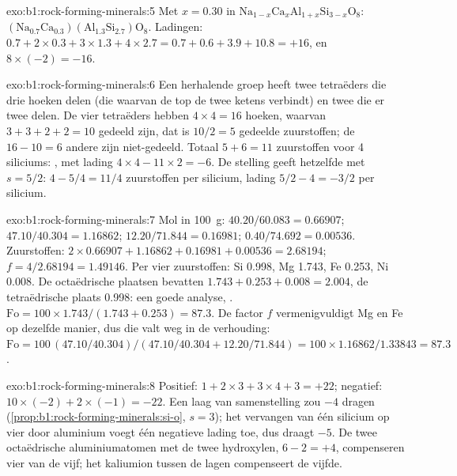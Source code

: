 \begin{solution}{exo:b1:rock-forming-minerals:5}
Met $x = 0.30$ in $\mathrm{Na}_{1-x}\mathrm{Ca}_x\mathrm{Al}_{1+x}\mathrm{Si}_{3-x}\mathrm{O}_8$:
$\mathrm{(Na_{0.7}Ca_{0.3})(Al_{1.3}Si_{2.7})O_8}$. Ladingen:
$0.7 + 2\times0.3 + 3\times1.3 + 4\times2.7 = 0.7 + 0.6 + 3.9 + 10.8 = +16$,
en $8\times(-2) = -16$.
\end{solution}

\begin{solution}{exo:b1:rock-forming-minerals:6}
Een herhalende groep heeft twee tetraëders die drie hoeken delen (die waarvan de top de twee ketens verbindt) en
twee die er twee delen. De vier tetraëders hebben $4\times4 = 16$ hoeken, waarvan $3 + 3 + 2 + 2 = 10$ gedeeld zijn, dat is
$10/2 = 5$ gedeelde zuurstoffen; de $16 - 10 = 6$ andere zijn niet-gedeeld. Totaal
$5 + 6 = 11$ zuurstoffen voor 4 siliciums: , met lading
$4\times4 - 11\times2 = -6$. De stelling geeft hetzelfde met
$s = 5/2$: $4 - 5/4 = 11/4$ zuurstoffen per silicium, lading $5/2 - 4 = -3/2$ per
silicium.
\end{solution}

\begin{solution}{exo:b1:rock-forming-minerals:7}
Mol in \qty{100}{g}:  $40.20/60.083 = 0.66907$; 
$47.10/40.304 = 1.16862$;  $12.20/71.844 = 0.16981$; 
$0.40/74.692 = 0.00536$. Zuurstoffen: $2\times0.66907 + 1.16862 + 0.16981 +
0.00536 = 2.68194$; $f = 4/2.68194 = 1.49146$. Per vier zuurstoffen: Si
\num{0.998}, Mg \num{1.743}, Fe \num{0.253}, Ni \num{0.008}. De
octaëdrische plaatsen bevatten $1.743 + 0.253 + 0.008 = 2.004$, de tetraëdrische plaats
\num{0.998}: een goede analyse, .
$\mathrm{Fo} = 100\times1.743/(1.743 + 0.253) = 87.3$. De factor $f$
vermenigvuldigt Mg en Fe op dezelfde manier, dus die valt weg in de verhouding:
$\mathrm{Fo} = 100\,(47.10/40.304)/(47.10/40.304 + 12.20/71.844) =
100\times1.16862/1.33843 = 87.3$.
\end{solution}

\begin{solution}{exo:b1:rock-forming-minerals:8}
Positief: $1 + 2\times3 + 3\times4 + 3 = +22$; negatief:
$10\times(-2) + 2\times(-1) = -22$. Een laag van samenstelling  zou $-4$ dragen
(\cref{prop:b1:rock-forming-minerals:si-o}, $s = 3$); het vervangen van één silicium op vier door aluminium
voegt één negatieve lading toe, dus  draagt $-5$. De twee octaëdrische aluminiumatomen met de
twee hydroxylen, $6 - 2 = +4$, compenseren vier van de vijf; het kaliumion tussen de lagen compenseert de vijfde.
\end{solution}

